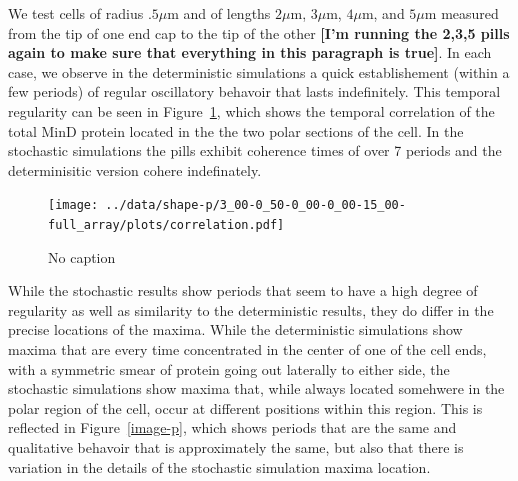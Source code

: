\documentclass[letterpaper,twocolumn,amsmath,amssymb,pre]{revtex4-1}
\newcommand{\red}[1]{{\bf \color{red} #1}}
\newcommand{\fixme}[1]{\red{[#1]}}
\newcommand\micron{\ensuremath{\mu\text{m}}}
\begin{document}

We test cells of radius $.5\micron$ and of lengths $2\micron$,
$3\micron$, $4\micron$, and $5\micron$ measured from the tip of one
end cap to the tip of the other \fixme{I'm running the 2,3,5 pills
  again to make sure that everything in this paragraph is true}. In
each case, we observe in the deterministic simulations a quick
establishement (within a few periods) of regular oscillatory behavoir
that lasts indefinitely.  This temporal regularity can be seen in
Figure~\ref{corr-pill}, which shows the temporal correlation of the
total MinD protein located in the the two polar sections of the cell.
In the stochastic simulations the pills exhibit coherence times of
over 7 periods and the determinisitic version cohere indefinately.

\begin{figure}
  \texttt{[image: ../data/shape-p/3\_00-0\_50-0\_00-0\_00-15\_00-full\_array/plots/correlation.pdf]}
  \caption{No caption}
  \label{corr-pill}
\end{figure}

While the stochastic results show periods that seem to have a high
degree of regularity as well as similarity to the deterministic
results, they do differ in the precise locations of the maxima.  While
the deterministic simulations show maxima that are every time
concentrated in the center of one of the cell ends, with a symmetric
smear of protein going out laterally to either side, the stochastic
simulations show maxima that, while always located somehwere in the
polar region of the cell, occur at different positions within this
region.  This is reflected in Figure~\ref{image-p}, which shows
periods that are the same and qualitative behavoir that is
approximately the same, but also that there is variation in the
details of the stochastic simulation maxima location.
\end{document}

